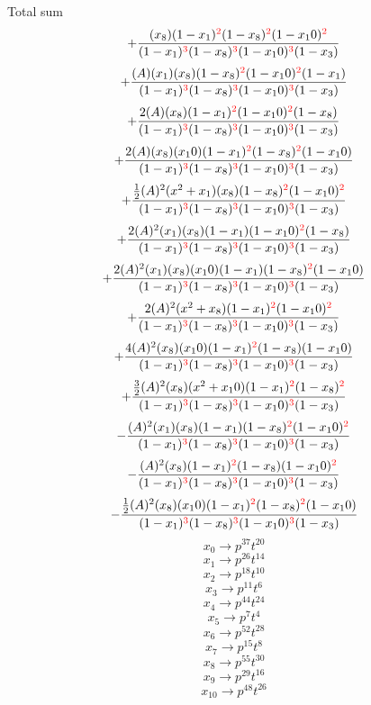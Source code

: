 \documentclass{article}
\begin{document}
Total sum
\[+\frac{(x_8)(1-x_1)^{\textcolor{red}{2}}(1-x_8)^{\textcolor{red}{2}}(1-x_10)^{\textcolor{red}{2}}}{(1-x_1)^{\textcolor{red}{3}}(1-x_8)^{\textcolor{red}{3}}(1-x_10)^{\textcolor{red}{3}}(1-x_3)}\]\[+\frac{(A)(x_1)(x_8)(1-x_8)^{\textcolor{red}{2}}(1-x_10)^{\textcolor{red}{2}}(1-x_1)}{(1-x_1)^{\textcolor{red}{3}}(1-x_8)^{\textcolor{red}{3}}(1-x_10)^{\textcolor{red}{3}}(1-x_3)}\]\[+\frac{2(A)(x_8)(1-x_1)^{\textcolor{red}{2}}(1-x_10)^{\textcolor{red}{2}}(1-x_8)}{(1-x_1)^{\textcolor{red}{3}}(1-x_8)^{\textcolor{red}{3}}(1-x_10)^{\textcolor{red}{3}}(1-x_3)}\]\[+\frac{2(A)(x_8)(x_10)(1-x_1)^{\textcolor{red}{2}}(1-x_8)^{\textcolor{red}{2}}(1-x_10)}{(1-x_1)^{\textcolor{red}{3}}(1-x_8)^{\textcolor{red}{3}}(1-x_10)^{\textcolor{red}{3}}(1-x_3)}\]\[+\frac{\frac{1}{2}(A)^{2}(x^{2}+x_1)(x_8)(1-x_8)^{\textcolor{red}{2}}(1-x_10)^{\textcolor{red}{2}}}{(1-x_1)^{\textcolor{red}{3}}(1-x_8)^{\textcolor{red}{3}}(1-x_10)^{\textcolor{red}{3}}(1-x_3)}\]\[+\frac{2(A)^{2}(x_1)(x_8)(1-x_1)(1-x_10)^{\textcolor{red}{2}}(1-x_8)}{(1-x_1)^{\textcolor{red}{3}}(1-x_8)^{\textcolor{red}{3}}(1-x_10)^{\textcolor{red}{3}}(1-x_3)}\]\[+\frac{2(A)^{2}(x_1)(x_8)(x_10)(1-x_1)(1-x_8)^{\textcolor{red}{2}}(1-x_10)}{(1-x_1)^{\textcolor{red}{3}}(1-x_8)^{\textcolor{red}{3}}(1-x_10)^{\textcolor{red}{3}}(1-x_3)}\]\[+\frac{2(A)^{2}(x^{2}+x_8)(1-x_1)^{\textcolor{red}{2}}(1-x_10)^{\textcolor{red}{2}}}{(1-x_1)^{\textcolor{red}{3}}(1-x_8)^{\textcolor{red}{3}}(1-x_10)^{\textcolor{red}{3}}(1-x_3)}\]\[+\frac{4(A)^{2}(x_8)(x_10)(1-x_1)^{\textcolor{red}{2}}(1-x_8)(1-x_10)}{(1-x_1)^{\textcolor{red}{3}}(1-x_8)^{\textcolor{red}{3}}(1-x_10)^{\textcolor{red}{3}}(1-x_3)}\]\[+\frac{\frac{3}{2}(A)^{2}(x_8)(x^{2}+x_10)(1-x_1)^{\textcolor{red}{2}}(1-x_8)^{\textcolor{red}{2}}}{(1-x_1)^{\textcolor{red}{3}}(1-x_8)^{\textcolor{red}{3}}(1-x_10)^{\textcolor{red}{3}}(1-x_3)}\]\[-\frac{(A)^{2}(x_1)(x_8)(1-x_1)(1-x_8)^{\textcolor{red}{2}}(1-x_10)^{\textcolor{red}{2}}}{(1-x_1)^{\textcolor{red}{3}}(1-x_8)^{\textcolor{red}{3}}(1-x_10)^{\textcolor{red}{3}}(1-x_3)}\]\[-\frac{(A)^{2}(x_8)(1-x_1)^{\textcolor{red}{2}}(1-x_8)(1-x_10)^{\textcolor{red}{2}}}{(1-x_1)^{\textcolor{red}{3}}(1-x_8)^{\textcolor{red}{3}}(1-x_10)^{\textcolor{red}{3}}(1-x_3)}\]\[-\frac{\frac{1}{2}(A)^{2}(x_8)(x_10)(1-x_1)^{\textcolor{red}{2}}(1-x_8)^{\textcolor{red}{2}}(1-x_10)}{(1-x_1)^{\textcolor{red}{3}}(1-x_8)^{\textcolor{red}{3}}(1-x_10)^{\textcolor{red}{3}}(1-x_3)}\]\[x_0\rightarrow{p^{37}t^{20}}\]\[x_1\rightarrow{p^{26}t^{14}}\]\[x_2\rightarrow{p^{18}t^{10}}\]\[x_3\rightarrow{p^{11}t^{6}}\]\[x_4\rightarrow{p^{44}t^{24}}\]\[x_5\rightarrow{p^{7}t^{4}}\]\[x_6\rightarrow{p^{52}t^{28}}\]\[x_7\rightarrow{p^{15}t^{8}}\]\[x_8\rightarrow{p^{55}t^{30}}\]\[x_9\rightarrow{p^{29}t^{16}}\]\[x_10\rightarrow{p^{48}t^{26}}\]
\end{document}
